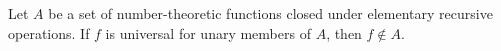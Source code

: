 Let $A$ be a set of number-theoretic functions closed under elementary recursive operations. If $f$ is universal for unary members of $A$, then $f \notin A$.
